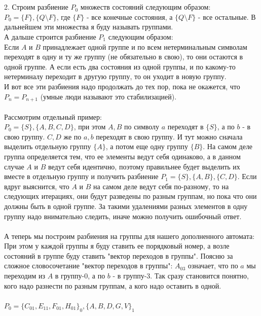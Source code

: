 \documentclass[14pt]{extreport}
\begin{document}
	\\\\
	2. Строим разбиение $P_{0}$ множеств состояний следующим образом:\\
	$P_{0}=\{F\},\{Q \setminus F\}$, где $\{F\}$ - все конечные состояния,
	а $\{Q \setminus F\}$ - все остальные. В дальнейшем эти множества я буду называть
	группами.\\
	А дальше строится разбиение $P_1$ следующим образом:\\
	Если $A$ и $B$ принадлежает одной группе и по всем нетерминальным символам
	переходят в одну и ту же группу (не обязательно в свою), то они остаются
	в одной группе. А если есть два состояния из одной группы, и по какому-то нетерминалу
	переходит в другую группу, то он уходит в новую группу.\\
	И вот все эти разбиения надо продолжать до тех пор, пока не окажется, что $P_{n}=P_{n+1}$
	(умные люди называют это стабилизацией).\\\\
	Рассмотрим отдельный пример:\\
	$P_0=\{S\}, \{A, B, C, D\}$, при этом $A, B$ по символу $a$ переходят в $\{S\}$, а по
	$b$ - в свою группу. $C, D$ же по $a, b$ переходят в свою группу. И тут можно сначала
	выделить отдельную группу $\{A\}$, а потом еще одну группу $\{B\}$. На самом деле группа
	определяется тем, что ее элементы ведут себя одинаково, а в данном случае $A$ и $B$ ведут
	себя идентично, поэтому правильнее будет выделить их вместе в отдельную группу и получить
	разбиение $P_1=\{S\},\{A,B\},\{C,D\}$. Если вдруг выяснится, что $A$ и $B$ на самом деле
	ведут себя по-разному, то на следующих итерациях, они будут разведены по разным группам,
	но пока что они должны быть в одной группе. За такими удалениями разных элементов в одну
	группу надо внимательно следить, иначе можно получить ошибочный ответ.\\\\
	А теперь мы построим разбиения на группы для нашего дополненного автомата:\\
	При этом у каждой группы я буду ставить ее порядковый номер, а возле состояний в группе
	буду ставить "вектор переходов в группы". Поясню за сложное словосочетание
	"вектор переходов в группы": $A_{03}$ означает,
	что по $a$ мы переходим из $A$ в группу-0, а по $b$ - в группу-3. Так сразу становится
	понятно, кого надо разнести по разным группам, а кого надо оставить в одной.\\\\
	$P_0=\{C_{01}, E_{11}, F_{01}, H_{01}\}_0,\{A, B, D, G, V\}_1$\\
\end{document}
